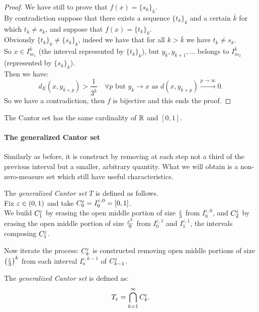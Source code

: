 \begin{proof}
	We have still to prove that $f(x) = \{s_k\}_k$.\\
	By contradiction suppose that there exists a sequence $\{t_k\}_k$ and a certain $\bar k$ for which $t_{\bar k} \neq s_{\bar k}$, and suppose that $f(x) = \{t_k\}_k$.\\
	Obviously $\{t_k\}_k \neq \{s_k\}_k$, indeed we have that for all $k > \bar k$ we have $t_k \neq s_k$.\\
	So $x \in I_{m_1}^{\bar k}$ (the interval represented by $\{t_k\}_k$), but $y_{\bar k}, y_{\bar k + 1}, \ldots$ belongs to $I_{m_2}^{\bar k}$ (represented by $\{s_k\}_k$).\\
	Then we have: 
	$$
	d_E(x, y_{\bar k + p}) 
	> \frac 1 {3^{\bar k}}
	\quad \forall p
	\text{ but }
	y_k 
	\to 
	x
	\text{ as }
	d(x, y_{k+p}) 
	\xrightarrow{p \to \infty}
	0
	.
	$$
	So we have a contradiction, then $f$ is bijective and this ends the proof.		
\end{proof}

\begin{prop}\label{Cantor-set-cardinalityofRR}
	The Cantor set has the same cardinality of $\mathbb R$ and $[0,1]$.
\end{prop}

\paragraph{The generalized Cantor set} Similarly as before, it is construct by removing at each step not a third of the previous interval but a smaller, arbitrary quantity. What we will obtain is a non-zero-measure set which still have useful characteristics.

\begin{defn}
	The \emph{generalized Cantor set} $T$ is defined as follows.\\
	Fix $\varepsilon \in (0, 1)$ and take $C_0^\varepsilon = I_0^{\varepsilon, 0} = [0, 1]$. \\
	We build $C_1^\varepsilon$ by erasing the open middle portion of size $\frac {\varepsilon} 3$ from $I_0^{\varepsilon, 0}$, and $C_2^\varepsilon$ by erasing the open middle portion of size $\frac {\varepsilon^2} 9$ from $I_0^{\varepsilon, 1}$ and $I_1^{\varepsilon, 1}$, the intervals composing $C_1^\varepsilon$.
	
	Now iterate the process: $C_k^\varepsilon$ is constructed removing open middle portions of size $\left( \frac {\varepsilon} 3 \right)^k$ from each interval $I_n^{\varepsilon, k-1}$ of $C_{k-1}^\varepsilon$.
	
	The \emph{generalized Cantor set} is defined as:
	$$
		T_\varepsilon 
		= \bigcap_{k=1}^\infty C_k^\varepsilon
	.
	$$
\end{defn}

